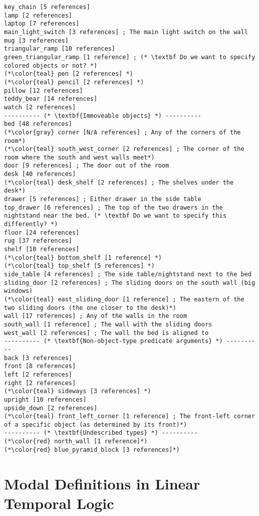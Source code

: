 \documentclass{article}
\begin{document}
\begin{lstlisting}
key_chain [5 references]
lamp [2 references]
laptop [7 references]
main_light_switch [3 references] ; The main light switch on the wall
mug [3 references]
triangular_ramp [10 references]
green_triangular_ramp [1 reference] ; (* \textbf Do we want to specify colored objects or not? *)
(*\color{teal} pen [2 references] *)
(*\color{teal} pencil [2 references] *)
pillow [12 references]
teddy_bear [14 references]
watch [2 references]
---------- (* \textbf{Immoveable objects} *) ----------
bed [48 references]
(*\color{gray} corner [N/A references] ; Any of the corners of the room*)
(*\color{teal} south_west_corner [2 references] ; The corner of the room where the south and west walls meet*)
door [9 references] ; The door out of the room
desk [40 references]
(*\color{teal} desk_shelf [2 references] ; The shelves under the desk*)
drawer [5 references] ; Either drawer in the side table
top_drawer [6 references] ; The top of the two drawers in the nightstand near the bed. (* \textbf Do we want to specify this differently? *)
floor [24 references]
rug [37 references]
shelf [10 references]
(*\color{teal} bottom_shelf [1 reference] *)
(*\color{teal} top_shelf [5 references] *)
side_table [4 references] ; The side table/nightstand next to the bed
sliding_door [2 references] ; The sliding doors on the south wall (big windows)
(*\color{teal} east_sliding_door [1 reference] ; The eastern of the two sliding doors (the one closer to the desk)*)
wall [17 references] ; Any of the walls in the room
south_wall [1 reference] ; The wall with the sliding doors
west_wall [2 references] ; The wall the bed is aligned to
---------- (* \textbf{Non-object-type predicate arguments} *) ----------
back [3 references]
front [8 references]
left [2 references]
right [2 references]
(*\color{teal} sideways [3 references] *)
upright [10 references]
upside_down [2 references]
(*\color{teal} front_left_corner [1 reference] ; The front-left corner of a specific object (as determined by its front)*)
---------- (* \textbf{Undescribed types} *) ----------
(*\color{red} north_wall [1 reference]*)
(*\color{red} blue_pyramid_block [3 references]*)
\end{lstlisting}




\section{Modal Definitions in Linear Temporal Logic}
\end{document}
